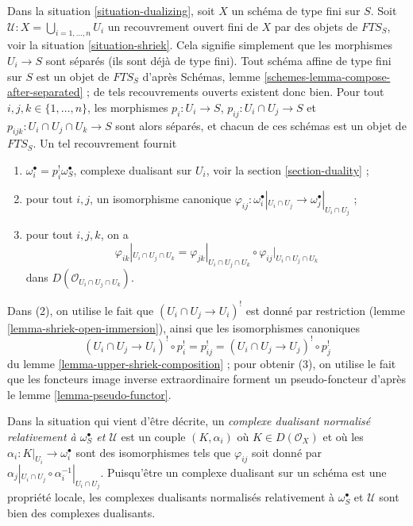 \noindent
Dans la situation \ref{situation-dualizing}, soit $X$ un schéma de type fini sur $S$. Soit $\mathcal{U} : X = \bigcup_{i = 1, \ldots, n} U_i$ un recouvrement ouvert fini de $X$ par des objets de $\textit{FTS}_S$, voir la situation \ref{situation-shriek}. Cela signifie simplement que les morphismes $U_i \to S$ sont séparés (ils sont déjà de type fini). Tout schéma affine de type fini sur $S$ est un objet de $\textit{FTS}_S$ d'après Schémas, lemme \ref{schemes-lemma-compose-after-separated} ; de tels recouvrements ouverts existent donc bien. Pour tout $i, j, k \in \{1, \ldots, n\}$, les morphismes $p_i : U_i \to S$, $p_{ij} : U_i \cap U_j \to S$ et $p_{ijk} : U_i \cap U_j \cap U_k \to S$ sont alors séparés, et chacun de ces schémas est un objet de $\textit{FTS}_S$. Un tel recouvrement fournit
\begin{enumerate}
\item $\omega_i^\bullet = p_i^!\omega_S^\bullet$, complexe dualisant sur $U_i$, voir la section \ref{section-duality} ;
\item pour tout $i, j$, un isomorphisme canonique $\varphi_{ij} :
\omega_i^\bullet|_{U_i \cap U_j} \to \omega_j^\bullet|_{U_i \cap U_j}$ ;
\item
\label{item-cocycle-glueing}
pour tout $i, j, k$, on a
$$
\varphi_{ik}|_{U_i \cap U_j \cap U_k} =
\varphi_{jk}|_{U_i \cap U_j \cap U_k} \circ
\varphi_{ij}|_{U_i \cap U_j \cap U_k}
$$
dans $D(\mathcal{O}_{U_i \cap U_j \cap U_k})$.
\end{enumerate}
Dans (2), on utilise le fait que $(U_i \cap U_j \to U_i)^!$ est donné par restriction (lemme \ref{lemma-shriek-open-immersion}), ainsi que les isomorphismes canoniques
$$
(U_i \cap U_j \to U_i)^! \circ p_i^! = p_{ij}^! =
(U_i \cap U_j \to U_j)^! \circ p_j^!
$$
du lemme \ref{lemma-upper-shriek-composition} ; pour obtenir (3), on utilise le fait que les foncteurs image inverse extraordinaire forment un pseudo-foncteur d'après le lemme \ref{lemma-pseudo-functor}.

\medskip\noindent
Dans la situation qui vient d'être décrite, un {\it complexe dualisant normalisé relativement à $\omega_S^\bullet$ et $\mathcal{U}$} est un couple $(K, \alpha_i)$ où $K \in D(\mathcal{O}_X)$ et où les $\alpha_i : K|_{U_i} \to \omega_i^\bullet$ sont des isomorphismes tels que $\varphi_{ij}$ soit donné par $\alpha_j|_{U_i \cap U_j} \circ \alpha_i^{-1}|_{U_i \cap U_j}$. Puisqu'être un complexe dualisant sur un schéma est une propriété locale, les complexes dualisants normalisés relativement à $\omega_S^\bullet$ et $\mathcal{U}$ sont bien des complexes dualisants.

